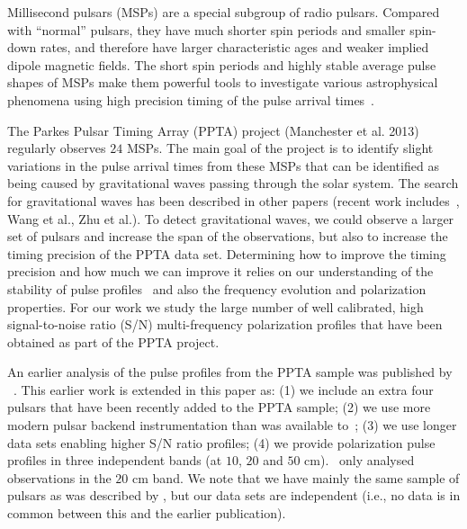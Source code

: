 \documentclass[useAMS,usenatbib]{mn2e}
\begin{document}
Millisecond pulsars (MSPs) are a special subgroup of radio pulsars. 
%
Compared with ``normal'' pulsars, they have much shorter spin periods 
and smaller spin-down rates, and therefore have larger characteristic 
ages and weaker implied dipole magnetic fields.
%
The short spin periods and highly stable average pulse shapes of MSPs 
make them powerful tools to investigate various astrophysical phenomena 
using high precision timing of the pulse arrival times~\citep[e.g.,][]{Manchester08}.
%

The Parkes Pulsar Timing Array (PPTA) project (Manchester et al. 2013) 
regularly observes $24$ MSPs. The main goal of the project is to identify 
slight variations in the pulse arrival times from these MSPs that can be 
identified as being caused by gravitational waves passing through the solar 
system.  
%
The search for gravitational waves has been described in other papers (recent 
work includes~\citet{Shannon13b}, Wang et al., Zhu et al.). 
%
To detect gravitational waves, we could observe a larger set of pulsars 
and increase the span of the observations, but also to increase the timing 
precision of the PPTA data set.
%
%
%
Determining how to improve the timing precision and how much we can improve 
it relies on our understanding of the stability of pulse profiles~\citep[e.g.,][]{Shannon14} 
and also the frequency evolution and polarization properties.
%
For our work we study the large number of well calibrated, high signal-to-noise 
ratio (S/N) multi-frequency polarization profiles that have been obtained as 
part of the PPTA project. 
%

An earlier analysis of the pulse profiles from the PPTA sample was published by
~\citet{Yan11}. This earlier work is extended in this paper as:
%
(1) we include an extra four pulsars that have been recently added to the PPTA sample;
(2) we use more modern pulsar backend instrumentation than was available to~\citet{Yan11};
(3) we use longer data sets enabling higher S/N ratio profiles;
(4) we provide polarization pulse profiles in three independent bands 
(at $10$, $20$ and $50$ cm).~\citet{Yan11} only analysed observations in the $20$ cm band.
%
We note that we have mainly the same sample of pulsars as was described by \citet{Yan11}, 
but our data sets are independent (i.e., no data is in common between this and the earlier 
publication).
\end{document}
